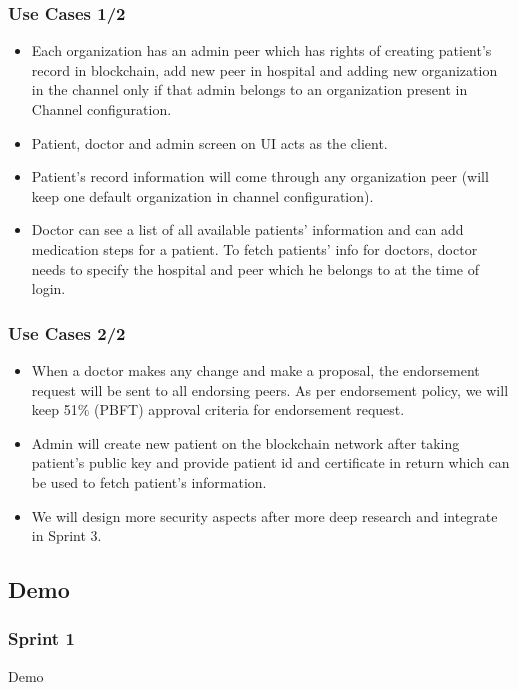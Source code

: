 \documentclass[english,hangout]{beamer}
\begin{document}
\begin{frame}
    \frametitle{Use Cases 1/2}
    \begin{itemize}
        \item Each organization has an admin peer which has rights of creating patient's record in blockchain, add new peer in hospital and adding new organization in the channel only if that admin belongs to an organization present in Channel configuration.
        \item Patient, doctor and admin screen on UI acts as the client.
        \item Patient's record information will come through any organization peer (will keep one default organization in channel configuration).
        \item Doctor can see a list of all available patients' information and can add medication steps for a patient. To fetch patients' info for doctors, doctor needs to specify the hospital and peer which he belongs to at the time of login.
    \end{itemize}
\end{frame}

\begin{frame}
    \frametitle{Use Cases 2/2}
    \begin{itemize}
        \item When a doctor makes any change and make a proposal, the endorsement request will be sent to all endorsing peers. As per endorsement policy, we will keep 51\% (PBFT) approval criteria for endorsement request.
        \item Admin will create new patient on the blockchain network after taking patient's public key and provide patient id and certificate in return which can be used to fetch patient's information.
        \item We will design more security aspects after more deep research and integrate in Sprint 3.
    \end{itemize}
\end{frame}


\subsection{Demo}

\begin{frame}[fragile]
 \frametitle{Sprint 1}
    \begin{center}
        \vspace{-1.2em}
            Demo
        \end{center}
\end{frame}
\end{document}
